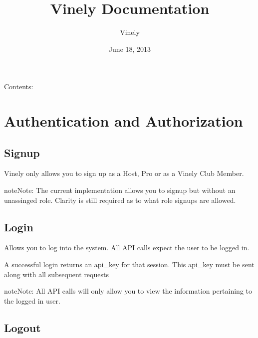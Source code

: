 \documentclass[letterpaper,10pt,english]{sphinxmanual}
\title{Vinely Documentation}
\date{June 18, 2013}
\author{Vinely}
\begin{document}
\maketitle
\tableofcontents
{}\label{index::doc}


Contents:


\chapter{Authentication and Authorization}
\label{auth:authentication-and-authorization}\label{auth:welcome-to-vinely-s-documentation}\label{auth::doc}\label{auth:ref-auth}

\section{Signup}
\label{auth:signup}
Vinely only allows you to sign up as a Host, Pro or as a Vinely Club Member.


\begin{fulllineitems}
\label{auth:post--api-v1-auth-signup-}
\end{fulllineitems}


\begin{notice}{note}{Note:}
The current implementation allows you to signup but without an unassinged role.
Clarity is still required as to what role signups are allowed.
\end{notice}


\section{Login}
\label{auth:login}
Allows you to log into the system. All API calls expect the user to be logged in.


\begin{fulllineitems}
\label{auth:post--api-v1-auth-login-}
\end{fulllineitems}


A successful login returns an api\_key for that session. This api\_key must be sent along with
all subsequent requests

\begin{notice}{note}{Note:}
All API calls will only allow you to view the information pertaining to the logged in user.
\end{notice}


\section{Logout}
\label{auth:logout}
\end{document}

